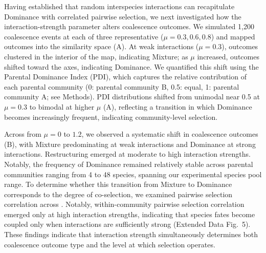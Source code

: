Having established that random interspecies interactions can recapitulate Dominance with correlated pairwise selection, we next investigated how the interaction-strength parameter alters coalescence outcomes. We simulated 1,200 coalescence events at each of three representative  ($\mu = 0.3, 0.6, 0.8$) and mapped outcomes into the similarity space (A). At weak interactions ($\mu = 0.3$), outcomes clustered in the interior of the map, indicating Mixture; as $\mu$ increased, outcomes shifted toward the axes, indicating Dominance. We quantified this shift using the Parental Dominance Index (PDI), which captures the relative contribution of each parental community (0: parental community B, 0.5: equal, 1: parental community A; see Methods). PDI distributions shifted from unimodal near 0.5 at $\mu = 0.3$ to bimodal at higher $\mu$ (A), reflecting a transition in which Dominance becomes increasingly frequent, indicating community-level selection.

Across  from $\mu = 0$ to $1.2$, we observed a systematic shift in coalescence outcomes (B), with Mixture predominating at weak interactions and Dominance at strong interactions. Restructuring emerged at moderate to high interaction strengths.  Notably, the frequency of Dominance remained relatively stable across parental communities ranging from 4 to 48 species, spanning our experimental species pool range. To determine whether this transition from Mixture to Dominance corresponds to the degree of co-selection, we examined pairwise selection correlation across . Notably, within-community pairwise selection correlation emerged only at high interaction strengths, indicating that species fates become coupled only when interactions are sufficiently strong (Extended Data Fig.~5). These findings indicate that interaction strength simultaneously determines both coalescence outcome type and the level at which selection operates.

